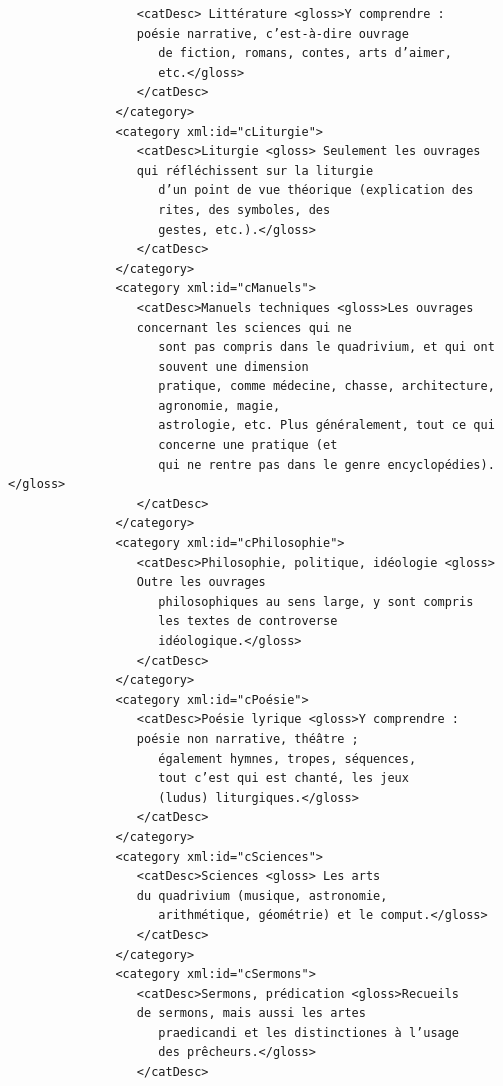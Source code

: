 \documentclass[a4paper,12pt,twoside]{book}
\begin{document}
\begin{verbatim}
                  <catDesc> Littérature <gloss>Y comprendre : 
                  poésie narrative, c’est-à-dire ouvrage
                     de fiction, romans, contes, arts d’aimer, 
                     etc.</gloss>
                  </catDesc>
               </category>
               <category xml:id="cLiturgie">
                  <catDesc>Liturgie <gloss> Seulement les ouvrages 
                  qui réfléchissent sur la liturgie
                     d’un point de vue théorique (explication des 
                     rites, des symboles, des
                     gestes, etc.).</gloss>
                  </catDesc>
               </category>
               <category xml:id="cManuels">
                  <catDesc>Manuels techniques <gloss>Les ouvrages 
                  concernant les sciences qui ne
                     sont pas compris dans le quadrivium, et qui ont 
                     souvent une dimension
                     pratique, comme médecine, chasse, architecture,
                     agronomie, magie,
                     astrologie, etc. Plus généralement, tout ce qui
                     concerne une pratique (et
                     qui ne rentre pas dans le genre encyclopédies).</gloss>
                  </catDesc>
               </category>
               <category xml:id="cPhilosophie">
                  <catDesc>Philosophie, politique, idéologie <gloss>
                  Outre les ouvrages
                     philosophiques au sens large, y sont compris 
                     les textes de controverse
                     idéologique.</gloss>
                  </catDesc>
               </category>
               <category xml:id="cPoésie">
                  <catDesc>Poésie lyrique <gloss>Y comprendre : 
                  poésie non narrative, théâtre ;
                     également hymnes, tropes, séquences, 
                     tout c’est qui est chanté, les jeux
                     (ludus) liturgiques.</gloss>
                  </catDesc>
               </category>
               <category xml:id="cSciences">
                  <catDesc>Sciences <gloss> Les arts 
                  du quadrivium (musique, astronomie,
                     arithmétique, géométrie) et le comput.</gloss>
                  </catDesc>
               </category>
               <category xml:id="cSermons">
                  <catDesc>Sermons, prédication <gloss>Recueils 
                  de sermons, mais aussi les artes
                     praedicandi et les distinctiones à l’usage 
                     des prêcheurs.</gloss>
                  </catDesc>

\end{verbatim}
\end{document}
